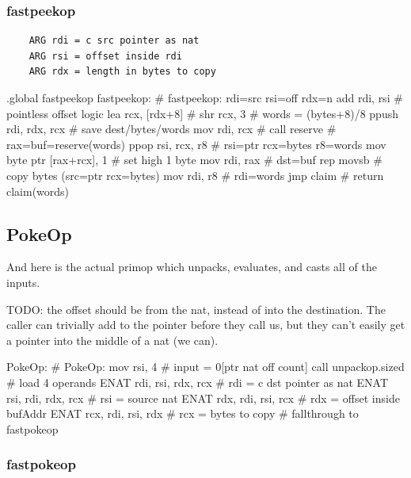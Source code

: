 \subsubsection{fastpeekop}

\begin{verbatim}
    ARG rdi = c src pointer as nat
    ARG rsi = offset inside rdi
    ARG rdx = length in bytes to copy
\end{verbatim}

\begin{asm}
.global fastpeekop
fastpeekop:                                 # fastpeekop: rdi=src rsi=off rdx=n
	add	rdi, rsi                    #   pointless offset logic
	lea	rcx, [rdx+8]                #
	shr	rcx, 3                      #   words = (bytes+8)/8
	ppush	rdi, rdx, rcx               #   save dest/bytes/words
	mov	rdi, rcx                    #
	call	reserve                     #   rax=buf=reserve(words)
	ppop	rsi, rcx, r8                #   rsi=ptr rcx=bytes r8=words
	mov	byte ptr [rax+rcx], 1       #   set high 1 byte
	mov	rdi, rax                    #   dst=buf
	rep	movsb                       #   copy bytes (src=ptr rcx=bytes)
	mov	rdi, r8                     #   rdi=words
	jmp	claim                       #   return claim(words)
\end{asm}

\subsection{PokeOp}

And here is the actual primop which unpacks, evaluates, and casts all
of the inputs.

TODO: the offset should be from the nat, instead of into the destination.
The caller can trivially add to the pointer before they call us, but they
can't easily get a pointer into the middle of a nat (we can).

\begin{asm}
PokeOp:                                     # PokeOp:
	mov	rsi, 4                      #   input = 0[ptr nat off count]
	call	unpackop.sized              #   load 4 operands
	ENAT	rdi, rsi, rdx, rcx          #   rdi = c dst pointer as nat
	ENAT	rsi, rdi, rdx, rcx          #   rsi = source nat
	ENAT	rdx, rdi, rsi, rcx          #   rdx = offset inside bufAddr
	ENAT	rcx, rdi, rsi, rdx          #   rcx = bytes to copy
	# fallthrough to fastpokeop
\end{asm}

\subsubsection{fastpokeop}

